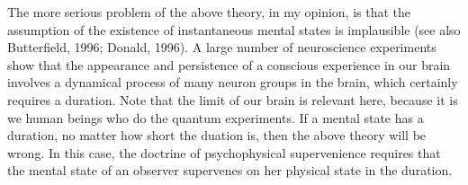 

The more serious problem of the above theory, in my opinion, is that the assumption of the existence of instantaneous mental states is implausible (see also Butterfield, 1996; Donald, 1996).
A large number of neuroscience experiments show that the appearance and persistence of a conscious experience in our brain involves a dynamical process of many neuron groups in the brain, which certainly requires a duration.
Note that the limit of our brain is relevant here, because it is we human beings who do the quantum experiments. %
If a mental state has a duration, no matter how short the duation is, then the above theory will be wrong.
In this case, the doctrine of psychophysical supervenience requires that the mental state of an observer  supervenes on her physical state in the duration. 


